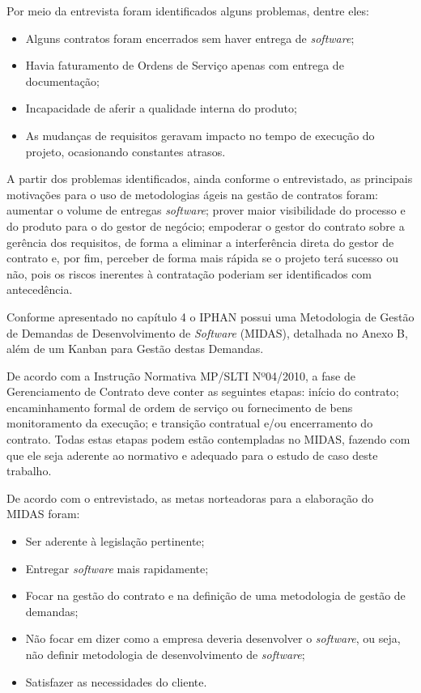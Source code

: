 Por meio da entrevista foram identificados alguns problemas, dentre eles:
\begin{itemize}
\item Alguns contratos foram encerrados sem haver entrega de \textit{software};
\item Havia faturamento de Ordens de Serviço apenas com entrega de documentação;
\item Incapacidade de aferir a qualidade interna do produto;
\item As mudanças de requisitos geravam impacto no tempo de execução do projeto, ocasionando constantes atrasos.
\end{itemize}

A partir dos problemas identificados, ainda conforme o entrevistado, as principais motivações para o uso de metodologias ágeis na gestão de contratos foram: aumentar o volume de entregas \textit{software}; prover maior visibilidade do processo e do produto para o do gestor de negócio; empoderar o gestor do contrato sobre a gerência dos requisitos, de forma a eliminar  a interferência direta do gestor de contrato e, por fim, perceber de forma mais rápida se o projeto terá sucesso ou não, pois os riscos inerentes à contratação poderiam ser identificados com antecedência.

Conforme apresentado no capítulo 4 o IPHAN possui uma Metodologia de Gestão de Demandas de Desenvolvimento de \textit{Software} (MIDAS), detalhada no Anexo B, além de um Kanban para Gestão destas Demandas. 

De acordo com a Instrução Normativa MP/SLTI Nº04/2010, a fase de Gerenciamento de Contrato deve conter as seguintes etapas: início do contrato; encaminhamento formal de ordem de serviço ou fornecimento de bens  monitoramento da execução; e transição contratual e/ou encerramento do contrato. Todas estas etapas podem estão contempladas no MIDAS, fazendo com que ele seja aderente ao normativo e adequado para o estudo de caso deste trabalho.

De acordo com o entrevistado, as metas norteadoras para a elaboração do MIDAS foram:
\begin{itemize}
\item Ser aderente à legislação pertinente;
\item Entregar \textit{software} mais rapidamente;
\item Focar na gestão do contrato e na definição de uma metodologia de gestão de demandas;
\item Não focar em dizer como a empresa deveria desenvolver o \textit{software}, ou seja, não definir metodologia de desenvolvimento de \textit{software};
\item Satisfazer as necessidades do cliente.
\end{itemize}

